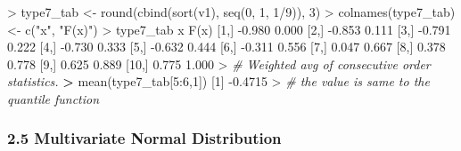 \documentclass[
]{article}
\newenvironment{Shaded}{\begin{snugshade}}{\end{snugshade}}
\newcommand{\CommentTok}[1]{\textcolor[rgb]{0.56,0.35,0.01}{\textit{#1}}}
\newcommand{\DecValTok}[1]{\textcolor[rgb]{0.00,0.00,0.81}{#1}}
\newcommand{\ErrorTok}[1]{\textcolor[rgb]{0.64,0.00,0.00}{\textbf{#1}}}
\newcommand{\FloatTok}[1]{\textcolor[rgb]{0.00,0.00,0.81}{#1}}
\newcommand{\FunctionTok}[1]{\textcolor[rgb]{0.00,0.00,0.00}{#1}}
\newcommand{\NormalTok}[1]{#1}
\newcommand{\OtherTok}[1]{\textcolor[rgb]{0.56,0.35,0.01}{#1}}
\newcommand{\SpecialCharTok}[1]{\textcolor[rgb]{0.00,0.00,0.00}{#1}}
\newcommand{\StringTok}[1]{\textcolor[rgb]{0.31,0.60,0.02}{#1}}
\begin{document}
\begin{Shaded}
\begin{Highlighting}[]
\SpecialCharTok{\textgreater{}}\NormalTok{ type7\_tab }\OtherTok{\textless{}{-}} \FunctionTok{round}\NormalTok{(}\FunctionTok{cbind}\NormalTok{(}\FunctionTok{sort}\NormalTok{(v1), }\FunctionTok{seq}\NormalTok{(}\DecValTok{0}\NormalTok{, }\DecValTok{1}\NormalTok{, }\DecValTok{1}\SpecialCharTok{/}\DecValTok{9}\NormalTok{)), }\DecValTok{3}\NormalTok{)}
\SpecialCharTok{\textgreater{}} \FunctionTok{colnames}\NormalTok{(type7\_tab) }\OtherTok{\textless{}{-}} \FunctionTok{c}\NormalTok{(}\StringTok{"x"}\NormalTok{, }\StringTok{"F(x)"}\NormalTok{)}
\SpecialCharTok{\textgreater{}}\NormalTok{ type7\_tab}
\NormalTok{           x  }\FunctionTok{F}\NormalTok{(x)}
\NormalTok{ [}\DecValTok{1}\NormalTok{,] }\SpecialCharTok{{-}}\FloatTok{0.980} \FloatTok{0.000}
\NormalTok{ [}\DecValTok{2}\NormalTok{,] }\SpecialCharTok{{-}}\FloatTok{0.853} \FloatTok{0.111}
\NormalTok{ [}\DecValTok{3}\NormalTok{,] }\SpecialCharTok{{-}}\FloatTok{0.791} \FloatTok{0.222}
\NormalTok{ [}\DecValTok{4}\NormalTok{,] }\SpecialCharTok{{-}}\FloatTok{0.730} \FloatTok{0.333}
\NormalTok{ [}\DecValTok{5}\NormalTok{,] }\SpecialCharTok{{-}}\FloatTok{0.632} \FloatTok{0.444}
\NormalTok{ [}\DecValTok{6}\NormalTok{,] }\SpecialCharTok{{-}}\FloatTok{0.311} \FloatTok{0.556}
\NormalTok{ [}\DecValTok{7}\NormalTok{,]  }\FloatTok{0.047} \FloatTok{0.667}
\NormalTok{ [}\DecValTok{8}\NormalTok{,]  }\FloatTok{0.378} \FloatTok{0.778}
\NormalTok{ [}\DecValTok{9}\NormalTok{,]  }\FloatTok{0.625} \FloatTok{0.889}
\NormalTok{[}\DecValTok{10}\NormalTok{,]  }\FloatTok{0.775} \FloatTok{1.000}
\SpecialCharTok{\textgreater{}} \CommentTok{\# Weighted avg of consecutive order statistics.}
\ErrorTok{\textgreater{}} \FunctionTok{mean}\NormalTok{(type7\_tab[}\DecValTok{5}\SpecialCharTok{:}\DecValTok{6}\NormalTok{,}\DecValTok{1}\NormalTok{])}
\NormalTok{[}\DecValTok{1}\NormalTok{] }\SpecialCharTok{{-}}\FloatTok{0.4715}
\SpecialCharTok{\textgreater{}} \CommentTok{\# the value is same to the quantile function}
\end{Highlighting}
\end{Shaded}

\hypertarget{multivariate-normal-distribution}{%
\subsubsection{2.5 Multivariate Normal
Distribution}\label{multivariate-normal-distribution}}
\end{document}
